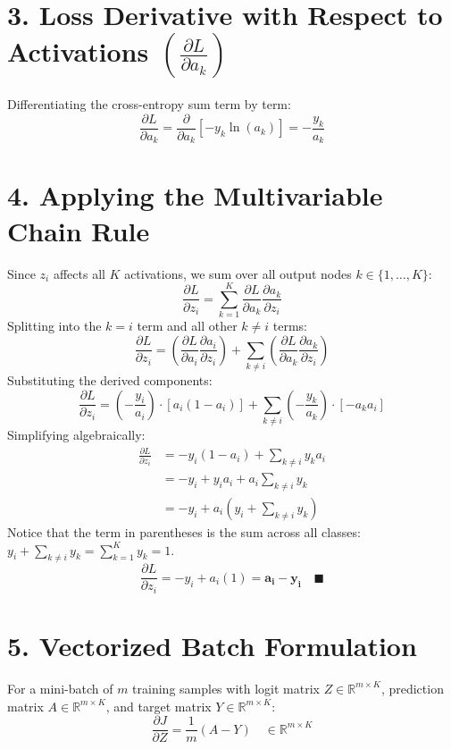 \documentclass[10pt,a4paper]{article}
\begin{document}
\section*{3. Loss Derivative with Respect to Activations $\left(\frac{\partial L}{\partial a_k}\right)$}
Differentiating the cross-entropy sum term by term:
\[
\frac{\partial L}{\partial a_k} = \frac{\partial}{\partial a_k} \left[ - y_k \ln(a_k) \right] = - \frac{y_k}{a_k}
\]

\section*{4. Applying the Multivariable Chain Rule}
Since $z_i$ affects all $K$ activations, we sum over all output nodes $k \in \{1, \dots, K\}$:
\[
\frac{\partial L}{\partial z_i} = \sum_{k=1}^K \frac{\partial L}{\partial a_k} \frac{\partial a_k}{\partial z_i}
\]
Splitting into the $k = i$ term and all other $k \neq i$ terms:
\[
\frac{\partial L}{\partial z_i} = \left(\frac{\partial L}{\partial a_i} \frac{\partial a_i}{\partial z_i}\right) + \sum_{k \neq i} \left(\frac{\partial L}{\partial a_k} \frac{\partial a_k}{\partial z_i}\right)
\]
Substituting the derived components:
\[
\frac{\partial L}{\partial z_i} = \left(-\frac{y_i}{a_i}\right) \cdot \left[ a_i (1 - a_i) \right] + \sum_{k \neq i} \left(-\frac{y_k}{a_k}\right) \cdot \left[ - a_k a_i \right]
\]
Simplifying algebraically:
\begin{align*}
\frac{\partial L}{\partial z_i} &= - y_i (1 - a_i) + \sum_{k \neq i} y_k a_i \\
&= - y_i + y_i a_i + a_i \sum_{k \neq i} y_k \\
&= - y_i + a_i \left( y_i + \sum_{k \neq i} y_k \right)
\end{align*}
Notice that the term in parentheses is the sum across all classes: $y_i + \sum_{k \neq i} y_k = \sum_{k=1}^K y_k = 1$.
\[
\frac{\partial L}{\partial z_i} = - y_i + a_i (1) = \mathbf{a_i - y_i} \quad \blacksquare
\]

\section*{5. Vectorized Batch Formulation}
For a mini-batch of $m$ training samples with logit matrix $Z \in \mathbb{R}^{m \times K}$, prediction matrix $A \in \mathbb{R}^{m \times K}$, and target matrix $Y \in \mathbb{R}^{m \times K}$:
\[
\frac{\partial J}{\partial Z} = \frac{1}{m} (A - Y) \quad \in \mathbb{R}^{m \times K}
\]
\end{document}
